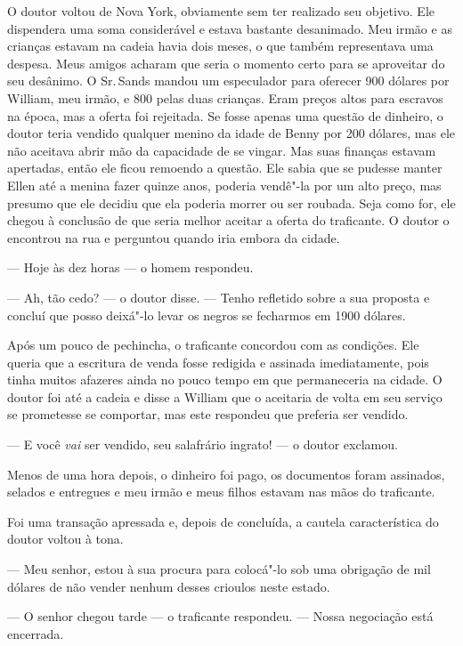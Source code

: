 O doutor voltou de Nova York,
obviamente sem ter realizado seu objetivo. Ele dispendera uma soma
considerável e estava bastante desanimado. Meu irmão e as crianças
estavam na cadeia havia dois meses, o que também representava uma
despesa. Meus amigos acharam que seria o momento certo para se
aproveitar do seu desânimo. O Sr.\,Sands mandou um especulador para
oferecer 900 dólares por William, meu irmão, e 800 pelas duas crianças.
Eram preços altos para escravos na época, mas a oferta foi rejeitada. Se
fosse apenas uma questão de dinheiro, o doutor teria vendido qualquer
menino da idade de Benny por 200 dólares, mas ele não aceitava abrir mão
da capacidade de se vingar. Mas suas finanças estavam apertadas, então
ele ficou remoendo a questão. Ele sabia que se pudesse manter Ellen até
a menina fazer quinze anos, poderia vendê"-la por um alto preço, mas
presumo que ele decidiu que ela poderia morrer ou ser roubada. Seja como
for, ele chegou à conclusão de que seria melhor aceitar a oferta do
traficante. O doutor o encontrou na rua e perguntou quando iria embora
da cidade.

--- Hoje às dez horas --- o homem respondeu.

--- Ah, tão cedo? --- o doutor disse. --- Tenho refletido sobre a sua
proposta e concluí que posso deixá"-lo levar os negros se fecharmos em
1900 dólares.

Após um pouco de pechincha, o traficante concordou com as condições. Ele
queria que a escritura de venda fosse redigida e assinada imediatamente,
pois tinha muitos afazeres ainda no pouco tempo em que permaneceria na
cidade. O doutor foi até a cadeia e disse a William que o aceitaria de
volta em seu serviço se prometesse se comportar, mas este respondeu que
preferia ser vendido.

--- E você \emph{vai} ser vendido, seu salafrário ingrato! --- o doutor
exclamou.

Menos de uma hora depois, o dinheiro foi pago, os documentos foram
assinados, selados e entregues e meu irmão e meus filhos estavam nas
mãos do traficante.

Foi uma transação apressada e, depois
de concluída, a cautela característica do doutor voltou à tona.

--- Meu senhor, estou à sua procura para colocá"-lo sob uma obrigação de
mil dólares de não vender nenhum desses crioulos neste estado.

--- O senhor chegou tarde --- o traficante respondeu. --- Nossa
negociação está encerrada.

